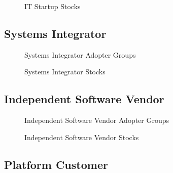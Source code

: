 	\begin{figure}[htb]
		\centering
		
		\caption{IT Startup Stocks}
	\end{figure}

	\newpage
	\subsection{Systems Integrator}\label{ch:app05:cs:si}

	\begin{figure}[htb]
		\centering
		
		\caption{Systems Integrator Adopter Groups}
	\end{figure}

	\begin{figure}[htb]
		\centering
		
		\caption{Systems Integrator Stocks}
	\end{figure}

	\newpage
	\subsection{Independent Software Vendor}\label{ch:app05:cs:isv}

	\begin{figure}[htb]
		\centering
		
		\caption{Independent Software Vendor Adopter Groups}
	\end{figure}

	\begin{figure}[htb]
		\centering
		
		\caption{Independent Software Vendor Stocks}
	\end{figure}

	\newpage
	\subsection{Platform Customer}\label{ch:app05:cs:pc}
	
